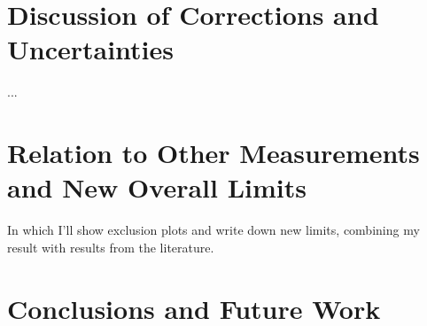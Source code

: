 \section{Discussion of Corrections and Uncertainties}
	...
	
\section{Relation to Other Measurements and New Overall Limits}
	In which I'll show exclusion plots and write down new limits, combining my result with results from the literature.


\section{Conclusions and Future Work}
